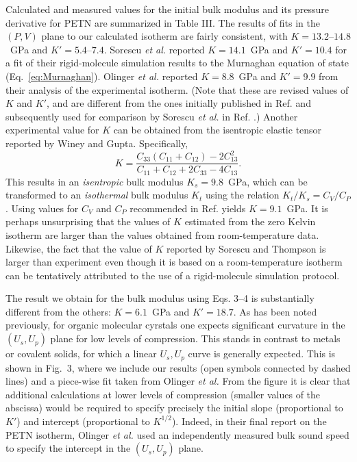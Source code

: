 \documentclass[prb,aps,nobibnotes,twocolumn,doublespace,twocolumngrid,superbib]{revtex4}
\begin{document}
Calculated and measured values for the initial bulk modulus and its 
pressure derivative for PETN are summarized in Table III.  The results
of fits in the $(P,V)$ plane to our calculated isotherm are fairly 
consistent, with $K=13.2$--$14.8$~GPa and $K'=5.4$--$7.4$.  Sorescu
{\it et al.}\cite{Sorescu_1999v103}  
reported $K=14.1$~GPa and $K'=10.4 $ for a fit of their
rigid-molecule simulation results to the Murnaghan equation of state 
(Eq.~\ref{eq:Murnaghan}). 
Olinger {\it et al.}\cite{Olinger_1976} reported $K=8.8$~GPa and $K'=9.9$ 
from their
analysis of the experimental isotherm.  (Note that these
are revised values of $K$ and $K'$, and are different from the 
ones initially published in Ref. \cite{Olinger_1975v62} and subsequently
used for comparison by 
Sorescu {\it et al.}\/ in Ref. \cite{Sorescu_1999v103}.)  Another experimental 
value for $K$
can be obtained from the isentropic elastic tensor reported by Winey and 
Gupta\cite{Winey_2001v90}.  Specifically, 
\begin{equation}
K=\frac{C_{33}(C_{11}+C_{12})-2C_{13}^2}{C_{11}+C_{12}+2C_{33}-4C_{13}}.
\end{equation}
This results in an {\em isentropic} bulk modulus $K_s=9.8$~GPa, which can 
be transformed to an {\em isothermal} bulk modulus $K_t$ using the relation 
$K_t/K_s=C_V/C_P$.  Using values for $C_V$ and $C_P$ recommended in Ref. 
\cite{Olinger_1976}  yields $K=9.1$~GPa. It is perhaps unsurprising that the values
of $K$ estimated from the zero Kelvin isotherm are larger than the values
obtained from room-temperature data.  Likewise, the fact that the value
of $K$ reported by Sorescu and Thompson is larger than experiment even
though it is based on a room-temperature isotherm can be tentatively 
attributed to the use of a rigid-molecule simulation protocol.

The result we obtain for the bulk modulus using Eqs. 3--4  is substantially 
different from the others: $K=6.1$~GPa and $K'=18.7$.  As has been 
noted previously, for organic molecular cyrstals one expects significant 
curvature in the $(U_s,U_p)$ plane for low levels of compression.  This 
stands in contrast to metals or covalent solids, for which a linear 
$U_s,U_p$ curve is generally expected.  This is shown in  Fig.~3, where
we include our results (open symbols connected by dashed lines) and
a piece-wise fit taken from Olinger {\it et al.}\cite{Olinger_1976}  From the 
figure it is
clear that additional calculations at lower levels of compression (smaller
values of the abscissa) would be required to specify precisely the
initial slope (proportional to $K'$) and intercept (proportional 
to $K^{1/2}$).  Indeed, in their final report on the PETN isotherm, Olinger
{\it et al.}\/ used an independently measured bulk sound speed to specify the
intercept in the $(U_s,U_p)$ plane.
\end{document}
